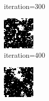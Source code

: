 \documentclass{article}
\begin{document}
\begin{figure}[h]
\begin{subfigure}[t]{0.18\textwidth}
\vspace{-0.6cm}
\caption{iteration=300}
\end{subfigure}\hspace{0.01\textwidth}
\begin{subfigure}[t]{0.18\textwidth}
\centering
\includegraphics[width=\textwidth]{./computational/results/gibbs_node_sampler_negative_iter_400.png}
\vspace{-0.6cm}
\caption{iteration=400}
\end{subfigure}\hspace{0.01\textwidth}
\begin{subfigure}[t]{0.18\textwidth}
\centering
\includegraphics[width=\textwidth]{./computational/results/gibbs_node_sampler_negative_iter_500.png}

\end{subfigure}
\end{figure}
\end{document}
